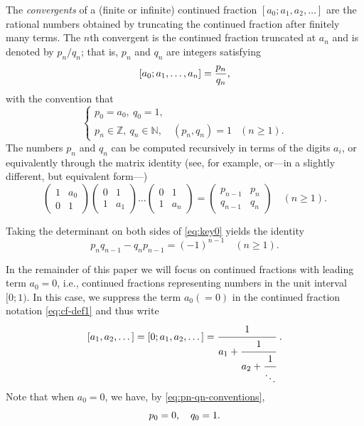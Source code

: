\documentclass[10pt]{article}
\theoremstyle{definition}
\numberwithin{equation}{section}
\numberwithin{lemma}{section}
\newcommand{\NN}{\mathbb{N}}
\newcommand{\ZZ}{\mathbb{Z}}
\newcommand{\mat}[1]{\begin{pmatrix} 0 & 1\\ 1 & #1\end{pmatrix}}
\begin{document}
The \emph{convergents} of a (finite or infinite) continued fraction 
$[a_0;a_1,a_2,\dots]$
are the rational numbers obtained by truncating the continued fraction 
after finitely many terms. The $n$th convergent is the continued
fraction truncated at $a_n$ and is 
denoted by $p_n/q_n$; that is, $p_n$ and $q_n$ are integers
satisfying  
\begin{equation}
\notag
[a_0;a_1,\dots,a_n]=\frac{p_n}{q_n},
\end{equation}
with the convention that
\begin{equation}
\label{eq:pn-qn-conventions}
\begin{cases}
p_0=a_0,\ q_0=1,&
\\
p_n\in\ZZ,\ q_n\in\NN,\quad (p_n,q_n)=1& (n\ge 1).
\end{cases}
\end{equation}
The numbers $p_n$ and $q_n$ can be computed recursively in terms of the digits
$a_i$, or equivalently through the matrix identity (see, for example,
{\cite[Section 1.3.2]{dajani-kraaikamp-book}}
or---in a slightly different,
but equivalent form---\cite[\S 5]{perron-book})
\begin{equation}
\label{eq:key0}
\begin{pmatrix} 1&a_0\\ 0 & 1\end{pmatrix}
\mat{a_1}\dots \mat{a_n}
=\begin{pmatrix} p_{n-1} & p_{n} \\ q_{n-1} &q_{n}\end{pmatrix}
\quad (n\ge 1).
\end{equation} 

Taking the determinant on both sides of \eqref{eq:key0} yields the
identity
\begin{equation}
\label{eq:determinant-formula}
p_nq_{n-1}-q_np_{n-1}=(-1)^{n-1}
\quad (n\ge 1).
\end{equation}


In the remainder of this paper we will focus on 
continued fractions with leading term $a_0=0$, i.e., continued fractions 
representing numbers in the unit interval $[0;1)$. 
In this case, we suppress the term $a_0(=0)$ in the continued fraction 
notation \eqref{eq:cf-def1} and thus write
\begin{equation}
\notag
[a_1,a_2,\dots]= [0; a_1,a_2,\dots]
=\cfrac{1}{a_1+\cfrac{1}{a_2+\cfrac{1}{\ddots}}} \ .
\end{equation}
Note that when $a_0=0$, we have,  by \eqref{eq:pn-qn-conventions},
\begin{equation}
\notag
p_0=0,\quad q_0=1.
\end{equation}
\end{document}
